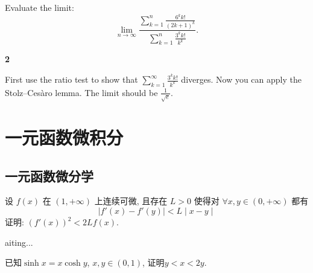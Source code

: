 \documentclass[12pt]{article}
\newenvironment{solution}[2][Solution]{\begin{trivlist}
\item[\hskip \labelsep {\bfseries #1}]}{\end{trivlist}}
\newenvironment{problem}[2][Problem]{\begin{trivlist}
\item[\hskip \labelsep {\bfseries #1}\hskip \labelsep {\bfseries #2.}]}{\end{trivlist}}
\begin{document}
\vspace{3cm}

\begin{problem}{2}
    Evaluate the limit:
    \[
        \displaystyle \lim_{n \to \infty} \frac{\sum_{k=1}^{n}\frac{6^k k!}{(2k+1)^k}}{\sum_{k=1}^{n} \frac{3^k k!}{k^k}}.
    \]
\end{problem}

\begin{solution}{2} \textbf{2}

    First use the ratio test to show that $\displaystyle\sum_{k=1}^{\infty}\frac{3^kk!}{k^k}$ diverges. Now you can apply the \\
    Stolz–Cesàro lemma. The limit should be $\displaystyle\frac{1}{\sqrt{e}}.$
    
\end{solution}


\section{一元函数微积分}

\subsection{一元函数微分学}

\begin{problem}{1}
设 $f(x)$ 在 $(1,+\infty)$ 上连续可微, 且存在 $L>0$ 使得对 $\forall x, y \in (0, +\infty)$ 都有
\[
\mid f'(x)-f'(y) \mid < L\mid x-y\mid
\]
证明: $(f'(x))^2 < 2Lf(x)$.

\end{problem}

\begin{solution}

Waiting...
\end{solution}

\vspace{3cm}

\begin{problem}{2}
    已知$\sinh x = x\cosh y$, $x, y \in \left(0, 1\right)$, 证明$y<x<2y$.
\end{problem}
\end{document}
